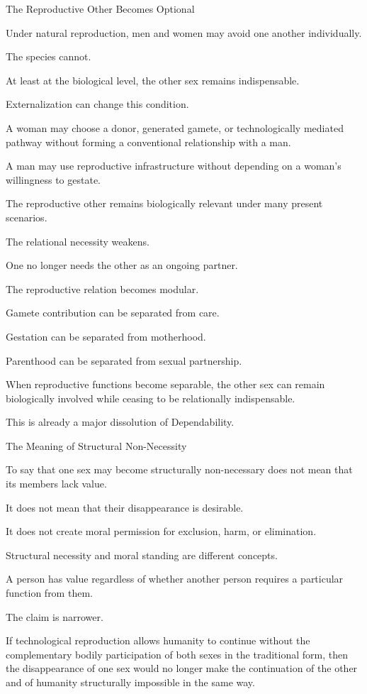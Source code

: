 The Reproductive Other Becomes Optional

Under natural reproduction, men and women may avoid one another individually.

The species cannot.

At least at the biological level, the other sex remains indispensable.

Externalization can change this condition.

A woman may choose a donor, generated gamete, or technologically mediated pathway without forming a conventional relationship with a man.

A man may use reproductive infrastructure without depending on a woman’s willingness to gestate.

The reproductive other remains biologically relevant under many present scenarios.

The relational necessity weakens.

One no longer needs the other as an ongoing partner.

The reproductive relation becomes modular.

Gamete contribution can be separated from care.

Gestation can be separated from motherhood.

Parenthood can be separated from sexual partnership.

When reproductive functions become separable, the other sex can remain biologically involved while ceasing to be relationally indispensable.

This is already a major dissolution of Dependability.

The Meaning of Structural Non-Necessity

To say that one sex may become structurally non-necessary does not mean that its members lack value.

It does not mean that their disappearance is desirable.

It does not create moral permission for exclusion, harm, or elimination.

Structural necessity and moral standing are different concepts.

A person has value regardless of whether another person requires a particular function from them.

The claim is narrower.

If technological reproduction allows humanity to continue without the complementary bodily participation of both sexes in the traditional form, then the disappearance of one sex would no longer make the continuation of the other and of humanity structurally impossible in the same way.

